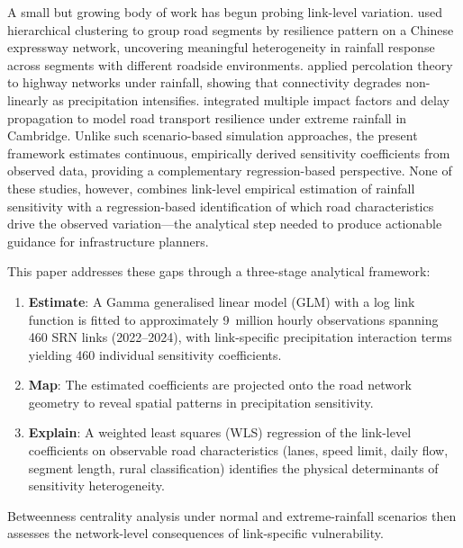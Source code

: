 \documentclass[review]{elsarticle}
\begin{document}
A small but growing body of work has begun probing link-level variation. \citet{gao2024resilience} used hierarchical clustering to group road segments by resilience pattern on a Chinese expressway network, uncovering meaningful heterogeneity in rainfall response across segments with different roadside environments. \citet{li2024percolation} applied percolation theory to highway networks under rainfall, showing that connectivity degrades non-linearly as precipitation intensifies. \citet{liu2026extreme} integrated multiple impact factors and delay propagation to model road transport resilience under extreme rainfall in Cambridge. Unlike such scenario-based simulation approaches, the present framework estimates continuous, empirically derived sensitivity coefficients from observed data, providing a complementary regression-based perspective. None of these studies, however, combines link-level empirical estimation of rainfall sensitivity with a regression-based identification of which road characteristics drive the observed variation---the analytical step needed to produce actionable guidance for infrastructure planners.

This paper addresses these gaps through a three-stage analytical framework:

\begin{enumerate}
    \item \textbf{Estimate}: A Gamma generalised linear model (GLM) with a log link function is fitted to approximately 9~million hourly observations spanning 460 SRN links (2022--2024), with link-specific precipitation interaction terms yielding 460 individual sensitivity coefficients.
    \item \textbf{Map}: The estimated coefficients are projected onto the road network geometry to reveal spatial patterns in precipitation sensitivity.
    \item \textbf{Explain}: A weighted least squares (WLS) regression of the link-level coefficients on observable road characteristics (lanes, speed limit, daily flow, segment length, rural classification) identifies the physical determinants of sensitivity heterogeneity.
\end{enumerate}

\noindent Betweenness centrality analysis under normal and extreme-rainfall scenarios then assesses the network-level consequences of link-specific vulnerability.
\end{document}
